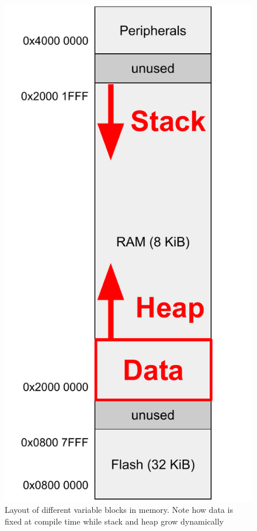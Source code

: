 \begin{figure}
    \centering
    \includegraphics[scale=0.7]{./fig/mem_allocation.pdf}
    \caption{Layout of different variable blocks in memory. Note how data is fixed at compile time while stack and heap grow dynamically}
    \label{fig:mem_allocation}
\end{figure}

